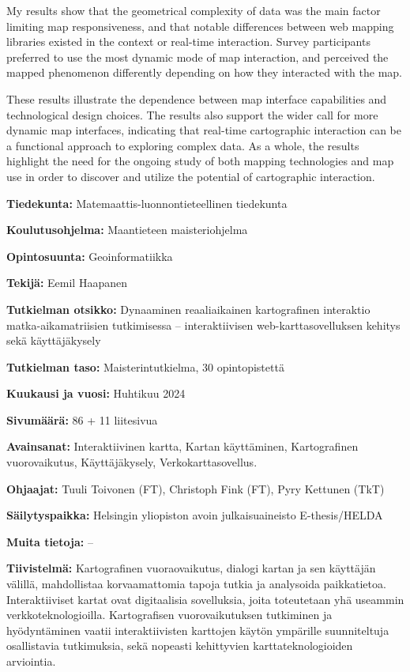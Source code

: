 \begin{spacing}{1}
My results show that the geometrical complexity of data was the main factor limiting
map responsiveness, and that notable differences between web mapping libraries existed
in the context or real-time interaction.
Survey participants preferred to use the most dynamic mode of map interaction,
and perceived the mapped phenomenon differently depending on how they interacted with the map.

These results illustrate the dependence between map interface capabilities and technological design choices.
The results also support the wider call for more dynamic map interfaces,
indicating that real-time cartographic interaction can be a functional approach to exploring complex data.
As a whole, the results highlight the need for the ongoing study of both mapping technologies and map use
in order to discover and utilize the potential of cartographic interaction.

\newpage

\textbf{Tiedekunta:} Matemaattis-luonnontieteellinen tiedekunta

\textbf{Koulutusohjelma:} Maantieteen maisteriohjelma

\textbf{Opintosuunta:} Geoinformatiikka

\textbf{Tekijä:} Eemil Haapanen

\textbf{Tutkielman otsikko:}
Dynaaminen reaaliaikainen kartografinen interaktio matka-aikamatriisien tutkimisessa --
interaktiivisen web-karttasovelluksen kehitys sekä käyttäjäkysely

\textbf{Tutkielman taso:} Maisterintutkielma, 30 opintopistettä

\textbf{Kuukausi ja vuosi:} Huhtikuu 2024  %

\textbf{Sivumäärä:} 86 + 11 liitesivua  %

\textbf{Avainsanat:}
Interaktiivinen kartta,
Kartan käyttäminen,
Kartografinen vuorovaikutus,
Käyttäjäkysely,
Verkokarttasovellus.

\textbf{Ohjaajat:} Tuuli Toivonen (FT), Christoph Fink (FT), Pyry Kettunen (TkT)

\textbf{Säilytyspaikka:} Helsingin yliopiston avoin julkaisuaineisto E-thesis/HELDA

\textbf{Muita tietoja:} --

\textbf{Tiivistelmä:}
Kartografinen vuoraovaikutus, dialogi kartan ja sen käyttäjän välillä, mahdollistaa
korvaamattomia tapoja tutkia ja analysoida paikkatietoa.
Interaktiiviset kartat ovat digitaalisia sovelluksia,
joita toteutetaan yhä useammin verkkoteknologioilla.
Kartografisen vuorovaikutuksen tutkiminen ja hyödyntäminen vaatii
interaktiivisten karttojen käytön ympärille suunniteltuja osallistavia tutkimuksia,
sekä nopeasti kehittyvien karttateknologioiden arviointia.


\end{spacing}
